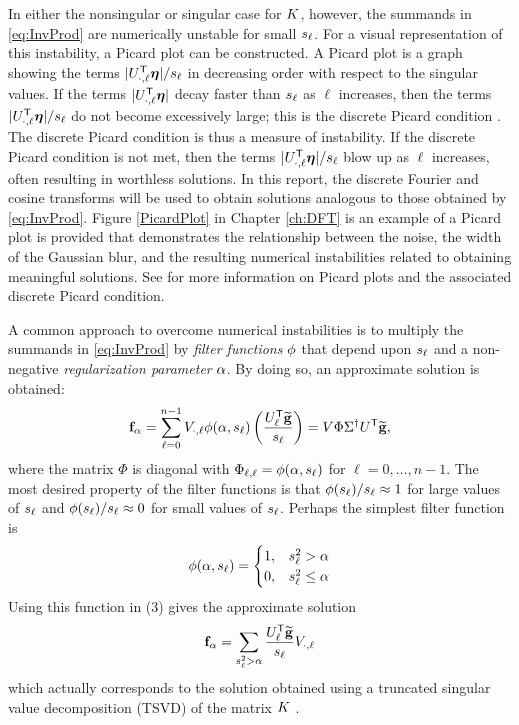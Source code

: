 In either the nonsingular or singular case for $K$, however, the summands in \eqref{eq:InvProd} are numerically unstable for small $s_\ell$. For a visual representation of this instability, a Picard plot can be constructed. A Picard plot is a graph showing the terms $|{U}^\mathsf{T}_{\cdot,\ell}\boldsymbol{\eta}|/s_\ell$ in decreasing order with respect to the singular values. If the terms $|{U}^\mathsf{T}_{\cdot,\ell}\boldsymbol{\eta}|$ decay faster than $s_\ell$ as $\ell$ increases, then the terms $|{U}^\mathsf{T}_{\cdot,\ell}\boldsymbol{\eta}|/s_\ell$ do not become excessively large; this is the discrete Picard condition \cite{ABT}. The discrete Picard condition is thus a measure of instability. If the discrete Picard condition is not met, then the terms $|{U}^\mathsf{T}_{\cdot,\ell}\boldsymbol{\eta}|/s_\ell$ blow up as $\ell$ increases, often resulting in worthless solutions. In this report, the discrete Fourier and cosine transforms will be used to obtain solutions analogous to those obtained by \eqref{eq:InvProd}. Figure \ref{PicardPlot} in Chapter \ref{ch:DFT} is an example of a Picard plot is provided that demonstrates the relationship between the noise, the width of the Gaussian blur, and the resulting numerical instabilities related to obtaining meaningful solutions. See \cite{Hansen1990} for more information on Picard plots and the associated discrete Picard condition. \par 
A common approach to overcome numerical instabilities is to multiply the summands in \eqref{eq:InvProd} by \textit{filter functions} $\phi$ that depend upon $s_\ell$ and a non-negative \textit{regularization parameter} $\alpha$. By doing so, an approximate solution is obtained:
\begin{equation}
\mathbf{f}_\alpha = \sum_{\ell = 0}^{n-1} V_{\cdot,\ell}\phi(\alpha,s_\ell)\left(\frac{{{U}^\mathsf{T}_\ell}\widetilde{\mathbf{g}}}{s_\ell}\right) = V\Phi\Sigma^\dagger {U}^\mathsf{T}\widetilde{\mathbf{g}},
\label{eq:ApproxSol}
\end{equation}
where the matrix $\Phi$ is diagonal with $\Phi_{\ell,\ell} = \phi(\alpha,s_\ell)$ for $\ell = 0,\ldots,{n-1}$. The most desired property of the filter functions is that $\phi(s_\ell)/s_\ell \approx 1$  for large values of $s_\ell$ and $\phi(s_\ell)/s_\ell \approx 0$ for small values of $s_\ell$.  Perhaps the simplest filter function is
\[\phi(\alpha,s_\ell) = \begin{cases}
1, & s_\ell^2 > \alpha \\
0, & s_\ell^2 \leq \alpha
\end{cases}\]
Using this function in (3) gives the approximate solution
\[\mathbf{f}_\alpha = \sum_{s_\ell^2 > \alpha} \frac{{{U}^\mathsf{T}_\ell}\widetilde{\mathbf{g}}}{s_\ell}V_{\cdot,\ell}\]
which actually corresponds to the solution obtained using a truncated singular value decomposition (TSVD) of the matrix $K$ \cite[p.~3-5]{Vogel:2002}. \par

